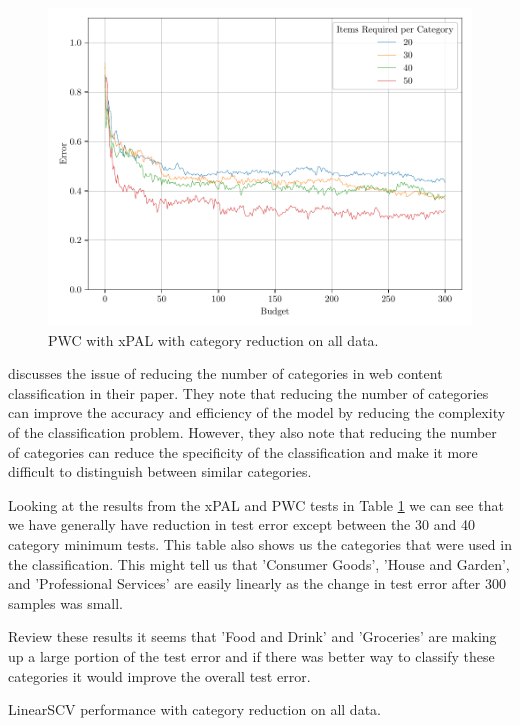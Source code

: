 \begin{figure}[ht]
    \centering
    \includegraphics[width=\scale\textwidth]{../img/plot_text_data_all_category_reduction_test_results_test_results.pdf}
    \caption{PWC with xPAL with category reduction on all data.}
    \label{fig:all_data_category_reduction_xpal}
\end{figure}

\cite{dumais2000hierarchical} discusses the issue of reducing the number of categories in web content classification in their paper. They note that reducing the number of categories can improve the accuracy and efficiency of the model by reducing the complexity of the classification problem. However, they also note that reducing the number of categories can reduce the specificity of the classification and make it more difficult to distinguish between similar categories.

Looking at the results from the xPAL and PWC tests in Table \ref{fig:all_data_category_reduction_xpal} we can see that we have generally have reduction in test error except between the 30 and 40 category minimum tests. This table also shows us the categories that were used in the classification. This might tell us that 'Consumer Goods', 'House and Garden', and 'Professional Services' are easily linearly as the change in test error after 300 samples was small.

Review these results it seems that 'Food and Drink' and 'Groceries' are making up a large portion of the test error and if there was better way to classify these categories it would improve the overall test error.

\begin{table}[ht]
     \centering  
     \caption{LinearSCV performance with category reduction on all data.}
     
     \label{tab:lscv_all_data_category_reduction} 
\end{table}



